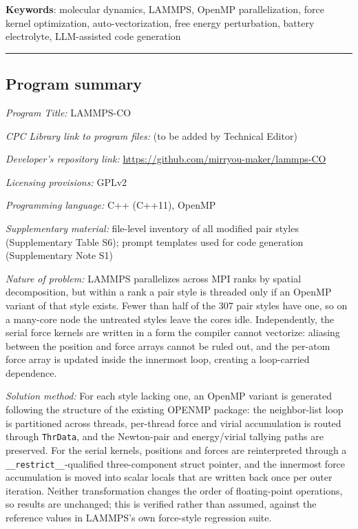 \documentclass[
  11pt,
]{article}
\begin{document}
\textbf{Keywords}: molecular dynamics, LAMMPS, OpenMP parallelization,
force kernel optimization, auto-vectorization, free energy perturbation,
battery electrolyte, LLM-assisted code generation

\begin{center}\rule{0.5\linewidth}{0.5pt}\end{center}

\subsection{Program summary}\label{program-summary}

\emph{Program Title:} LAMMPS-CO

\emph{CPC Library link to program files:} (to be added by Technical
Editor)

\emph{Developer's repository link:}
\url{https://github.com/mirryou-maker/lammps-CO}

\emph{Licensing provisions:} GPLv2

\emph{Programming language:} C++ (C++11), OpenMP

\emph{Supplementary material:} file-level inventory of all modified pair
styles (Supplementary Table S6); prompt templates used for code
generation (Supplementary Note S1)

\emph{Nature of problem:} LAMMPS parallelizes across MPI ranks by
spatial decomposition, but within a rank a pair style is threaded only
if an OpenMP variant of that style exists. Fewer than half of the 307
pair styles have one, so on a many-core node the untreated styles leave
the cores idle. Independently, the serial force kernels are written in a
form the compiler cannot vectorize: aliasing between the position and
force arrays cannot be ruled out, and the per-atom force array is
updated inside the innermost loop, creating a loop-carried dependence.

\emph{Solution method:} For each style lacking one, an OpenMP variant is
generated following the structure of the existing OPENMP package: the
neighbor-list loop is partitioned across threads, per-thread force and
virial accumulation is routed through \texttt{ThrData}, and the
Newton-pair and energy/virial tallying paths are preserved. For the
serial kernels, positions and forces are reinterpreted through a
\texttt{\_\_restrict\_\_}-qualified three-component struct pointer, and
the innermost force accumulation is moved into scalar locals that are
written back once per outer iteration. Neither transformation changes
the order of floating-point operations, so results are unchanged; this
is verified rather than assumed, against the reference values in
LAMMPS's own force-style regression suite.
\end{document}
